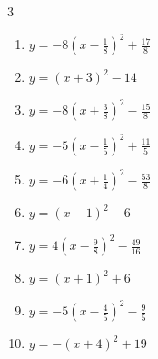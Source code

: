 \begin{multicols}{3}
\begin{enumerate}

\columnbreak %

\resetques

  \item $\displaystyle y=-8\left( x-\frac{1}{8}\right)^{2}+\frac{17}{8}$


  \item $\displaystyle y=\left( x+3\right)^{2}-14$

        \phantom{$\displaystyle 頂点\left( -3 , -14 \right)$}

  \item $\displaystyle y=-8\left( x+\frac{3}{8}\right)^{2}-\frac{15}{8}$


  \item $\displaystyle y=-5\left( x-\frac{1}{5}\right)^{2}+\frac{11}{5}$


  \item $\displaystyle y=-6\left( x+\frac{1}{4}\right)^{2}-\frac{53}{8}$


  \item $\displaystyle y=\left( x-1\right)^{2}-6$

        \phantom{$\displaystyle 頂点\left( 1 , -6 \right)$}

  \item $\displaystyle y=4\left( x-\frac{9}{8}\right)^{2}-\frac{49}{16}$


  \item $\displaystyle y=\left( x+1\right)^{2}+6$

        \phantom{$\displaystyle 頂点\left( -1 , 6 \right)$}

  \item $\displaystyle y=-5\left( x-\frac{4}{5}\right)^{2}-\frac{9}{5}$


  \item $\displaystyle y=-\left( x+4\right)^{2}+19$


\end{enumerate}
\end{multicols}
